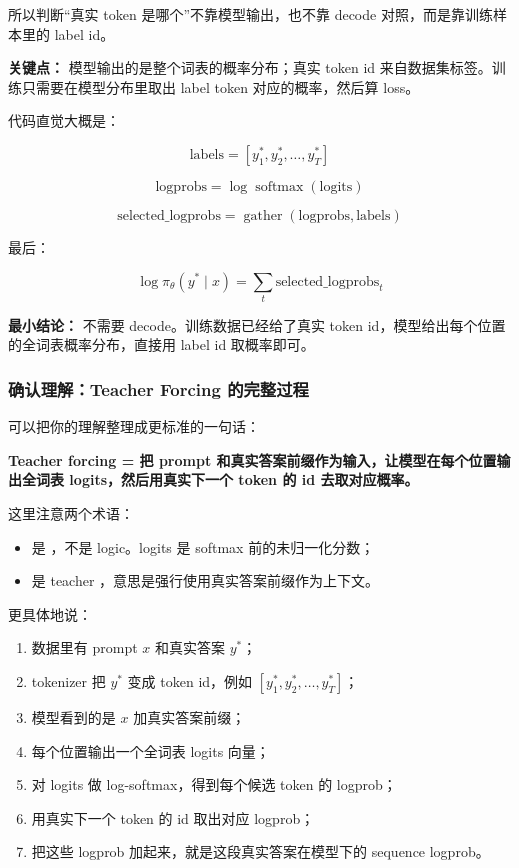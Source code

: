 所以判断“真实 token 是哪个”不靠模型输出，也不靠 decode 对照，而是靠训练样本里的 label id。

\begin{warnbox}
\textbf{关键点：} 模型输出的是整个词表的概率分布；真实 token id 来自数据集标签。训练只需要在模型分布里取出 label token 对应的概率，然后算 loss。
\end{warnbox}

代码直觉大概是：

\[
\text{labels} = [y_1^\ast, y_2^\ast, \ldots, y_T^\ast]
\]

\[
\text{logprobs} = \log \operatorname{softmax}(\text{logits})
\]

\[
\text{selected\_logprobs}
=
\operatorname{gather}(\text{logprobs}, \text{labels})
\]

最后：

\[
\log \pi_\theta(y^\ast \mid x)
=
\sum_t \text{selected\_logprobs}_t
\]

\begin{summarybox}
\textbf{最小结论：} 不需要 decode。训练数据已经给了真实 token id，模型给出每个位置的全词表概率分布，直接用 label id 取概率即可。
\end{summarybox}

\subsubsection{确认理解：Teacher Forcing 的完整过程}

可以把你的理解整理成更标准的一句话：

\begin{summarybox}
\textbf{Teacher forcing = 把 prompt 和真实答案前缀作为输入，让模型在每个位置输出全词表 logits，然后用真实下一个 token 的 id 去取对应概率。}
\end{summarybox}

这里注意两个术语：

\begin{itemize}[leftmargin=1.5em]
  \item 是 ，不是 logic。logits 是 softmax 前的未归一化分数；
  \item 是 teacher ，意思是强行使用真实答案前缀作为上下文。
\end{itemize}

更具体地说：

\begin{enumerate}[leftmargin=1.5em]
  \item 数据里有 prompt $x$ 和真实答案 $y^\ast$；
  \item tokenizer 把 $y^\ast$ 变成 token id，例如 $[y_1^\ast,y_2^\ast,\ldots,y_T^\ast]$；
  \item 模型看到的是 $x$ 加真实答案前缀；
  \item 每个位置输出一个全词表 logits 向量；
  \item 对 logits 做 log-softmax，得到每个候选 token 的 logprob；
  \item 用真实下一个 token 的 id 取出对应 logprob；
  \item 把这些 logprob 加起来，就是这段真实答案在模型下的 sequence logprob。
\end{enumerate}


